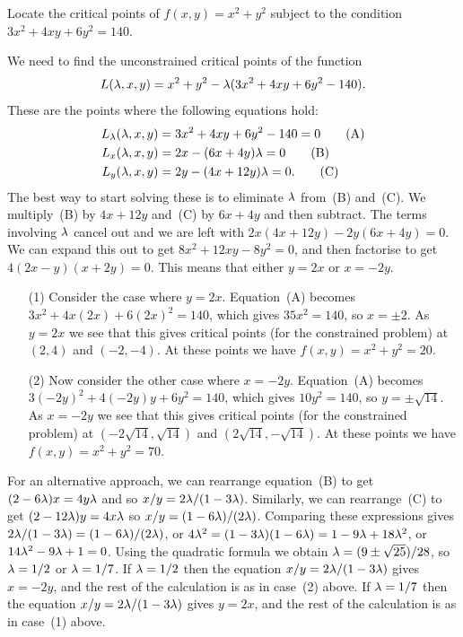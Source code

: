 \documentclass[a4paper]{amsart}
\renewenvironment{solution}{\SolutionInline}{\endSolutionInline}
\begin{document}
\begin{exercise}
 Locate the critical points of $f(x,y)=x^2+y^2$ subject to the
 condition $3x^2+4xy+6y^2=140$.
\end{exercise}
\begin{solution}
 We need to find the unconstrained critical points of the function
 \[ L(\lambda,x,y) = x^2+y^2 - \lambda(3x^2+4xy+6y^2-140). \]
 These are the points where the following equations hold:
 \begin{align*}
  L_\lambda(\lambda,x,y) &= 3x^2+4xy+6y^2-140 = 0 \tag{A} \\
  L_x(\lambda,x,y)   &= 2x - (6x + 4y)\lambda = 0 \tag{B} \\
  L_y(\lambda,x,y)   &= 2y - (4x + 12y)\lambda = 0. \tag{C}
 \end{align*}
 The best way to start solving these is to eliminate $\lambda$ from~(B)
 and~(C).  We multiply~(B) by $4x+12y$ and~(C) by $6x+4y$ and
 then subtract.  The terms involving $\lambda$ cancel out and we are left
 with $2x(4x+12y)-2y(6x+4y)=0$.  We can expand this out to get
 $8x^2+12xy-8y^2=0$, and then factorise to get $4(2x-y)(x+2y)=0$.
 This means that either $y=2x$ or $x=-2y$.  
 \begin{itemize}
  \item[(1)] Consider the case where $y=2x$.  Equation~(A) becomes
   $3x^2+4x(2x)+6(2x)^2=140$, which gives $35x^2=140$, so $x=\pm 2$.
   As $y=2x$ we see that this gives critical points (for the
   constrained problem) at $(2,4)$ and $(-2,-4)$.  At these points we
   have $f(x,y)=x^2+y^2=20$.
  \item[(2)] Now consider the other case where $x=-2y$.  Equation~(A)
   becomes $3(-2y)^2+4(-2y)y+6y^2=140$, which gives $10y^2=140$, so
   $y=\pm\sqrt{14}$.  As $x=-2y$ we see that this gives critical
   points (for the constrained problem) at $(-2\sqrt{14},\sqrt{14})$
   and $(2\sqrt{14},-\sqrt{14})$.  At these points we have
   $f(x,y)=x^2+y^2=70$.
 \end{itemize}

 For an alternative approach, we can rearrange equation~(B) to get 
 $(2-6\lambda)x=4y\lambda$ and so $x/y=2\lambda/(1-3\lambda)$.  Similarly, we can
 rearrange~(C) to get $(2-12\lambda)y=4x\lambda$ so $x/y=(1-6\lambda)/(2\lambda)$.
 Comparing these expressions gives $2\lambda/(1-3\lambda)=(1-6\lambda)/(2\lambda)$, or 
 $4\lambda^2=(1-3\lambda)(1-6\lambda)=1-9\lambda+18\lambda^2$, or $14\lambda^2-9\lambda+1=0$.
 Using the quadratic formula we obtain $\lambda=(9\pm\sqrt{25})/28$, so
 $\lambda=1/2$ or $\lambda=1/7$.  If $\lambda=1/2$ then the equation
 $x/y=2\lambda/(1-3\lambda)$ gives $x=-2y$, and the rest of the calculation is
 as in case~(2) above.  If $\lambda=1/7$ then the equation
 $x/y=2\lambda/(1-3\lambda)$ gives $y=2x$, and the rest of the calculation is
 as in case~(1) above.  


\end{solution}
\end{document}
